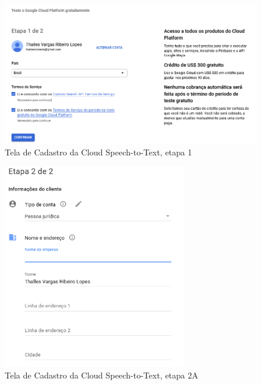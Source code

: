 \begin{figure}[h!]
\centering
\caption{Tela de Cadastro da Cloud Speech-to-Text, etapa 1}
\label{CloudCadastro1}
\includegraphics[width=140mm]{images/ConfigurarGoogle/cadastroetapa01.PNG}
\end{figure}

\begin{figure}[h!]
\centering
\caption{Tela de Cadastro da Cloud Speech-to-Text, etapa 2A}
\label{CloudCadastro2a}
\includegraphics[width=80mm]{images/ConfigurarGoogle/cadastroetapa02a.PNG}
\end{figure}

